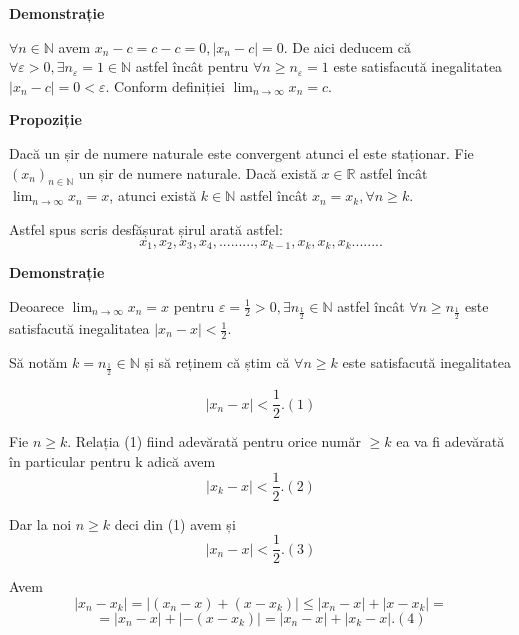 \documentclass[a4paper,12pt,oneside]{report}
\begin{document}
\textbf{Demonstrație}

\(\forall n\in \mathbb{N}\) avem \(x_{n} - c = c - c = 0 , \left | x_{n}-c \right |= 0\). De aici deducem că \(\forall \varepsilon > 0, \exists n_{\varepsilon} = 1 \in \mathbb{N}\) astfel încât pentru \(\forall n\geq n_{\varepsilon }= 1\) este satisfacută inegalitatea \(\left | x_{n}-c \right |= 0< \varepsilon\). 
	Conform definiției \(\lim_{n \to \infty }x_{n} = c. \)
	
\textbf{Propoziție}

Dacă un șir de numere naturale este convergent atunci el este staționar. 
Fie \((x_{n})_{n\in \mathbb{N}}\) un șir de numere naturale. Dacă există \(x\in \mathbb{R}\) astfel încât \(\lim_{n \to \infty }x_{n}= x\), atunci există \(k\in \mathbb{N}\) astfel încât \(x_{n}= x_{k}, \forall n\geq k\).
	
Astfel spus scris desfășurat șirul arată astfel:
\begin{displaymath}
x_{1},x_{2},x_{3},x_{4},.........,x_{k-1},x_{k},x_{k},x_{k}........
\end{displaymath}




\textbf{Demonstrație}

Deoarece \(\lim_{n \to \infty }x_{n}= x\) pentru \(\varepsilon = \frac{1}{2}> 0, \exists n_{\frac{1}{2}}\in \mathbb{N}\) astfel încât \(\forall n\geq n_{\frac{1}{2}}\) este satisfacută inegalitatea \(\left | x_{n} -x \right |<  \frac{1}{2}\). 
	
Să notăm \(k=n_{\frac{1}{2}}\in \mathbb{N}\) și să reținem că știm că \(\forall n\geq k \) este satisfacută inegalitatea 

\begin{displaymath}
  \left | x_{n} -x \right |< \frac{1}{2}. (1) 
\end{displaymath}


Fie \(n\geq k\). Relația (1) fiind adevărată pentru orice număr \(\geq k\) ea va fi adevărată în particular pentru k adică avem 
\begin{displaymath}
  \left | x_{k}-x \right |< \frac{1}{2}. (2)
\end{displaymath}


Dar la noi \(n\geq k\) deci din (1) avem și 
\begin{displaymath}
  \left | x_{n}-x \right |< \frac{1}{2}.(3)
\end{displaymath}


Avem 
\begin{displaymath}
  \left | x_{n}-x_{k} \right |= \left | (x_{n}-x)+(x-x_{k}) \right |\leq \left | x_{n}-x \right |+\left | x-x_{k} \right |= 
\end{displaymath}
\begin{displaymath}
  =\left | x_{n}-x \right |+ \left | -(x-x_{k}) \right |= \left | x_{n}-x \right |+ \left | x_{k} -x\right |. (4)
\end{displaymath}
\end{document}
